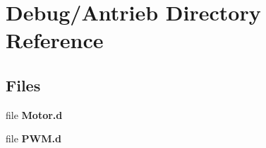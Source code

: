 \section{Debug/\+Antrieb Directory Reference}
\label{dir_74d9975639f1805d88abf603d9739d1e}
\subsection*{Files}
\begin{DoxyCompactItemize}
\item 
file {\bfseries Motor.\+d}
\item 
file {\bfseries P\+W\+M.\+d}
\end{DoxyCompactItemize}
